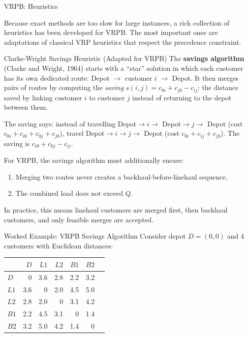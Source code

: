 \documentclass[aspectratio=169,10pt]{beamer}
\begin{document}
\begin{frame}[allowframebreaks]{VRPB: Heuristics}

Because exact methods are too slow for large instances, a rich collection of
heuristics has been developed for VRPB.  The most important ones are
adaptations of classical VRP heuristics that respect the precedence
constraint.

\begin{block}{Clarke-Wright Savings Heuristic (Adapted for VRPB)}
  The \textbf{savings algorithm} (Clarke and Wright, 1964) starts with a
  ``star'' solution in which each customer has its own dedicated route:
  Depot $\to$ customer $i$ $\to$ Depot.  It then merges pairs of routes
  by computing the \emph{saving} $s(i,j) = c_{0i} + c_{j0} - c_{ij}$:
  the distance saved by linking customer $i$ to customer $j$ instead of
  returning to the depot between them.

  \medskip
  The saving says: instead of travelling Depot$\to i \to$ Depot$\to j \to$
  Depot (cost $c_{0i}+c_{i0}+c_{0j}+c_{j0}$), travel Depot$\to i \to j \to$
  Depot (cost $c_{0i}+c_{ij}+c_{j0}$).  The saving is $c_{i0}+c_{0j}-c_{ij}$.

  \medskip
  For VRPB, the savings algorithm must additionally ensure:
  \begin{enumerate}
    \item Merging two routes never creates a backhaul-before-linehaul sequence.
    \item The combined load does not exceed $Q$.
  \end{enumerate}
  In practice, this means linehaul customers are merged first, then backhaul
  customers, and only feasible merges are accepted.
\end{block}

\framebreak

\begin{exampleblock}{Worked Example: VRPB Savings Algorithm}
  Consider depot $D=(0,0)$ and 4 customers with Euclidean distances:
  \begin{center}
  \begin{tabular}{lrrrrrr}
    \toprule
    & $D$ & $L1$ & $L2$ & $B1$ & $B2$ \\
    \midrule
    $D$  & 0 & 3.6 & 2.8 & 2.2 & 3.2 \\
    $L1$ & 3.6 & 0 & 2.0 & 4.5 & 5.0 \\
    $L2$ & 2.8 & 2.0 & 0 & 3.1 & 4.2 \\
    $B1$ & 2.2 & 4.5 & 3.1 & 0 & 1.4 \\
    $B2$ & 3.2 & 5.0 & 4.2 & 1.4 & 0 \\
    \bottomrule
  \end{tabular}
  \end{center}


\end{exampleblock}
\end{frame}
\end{document}
